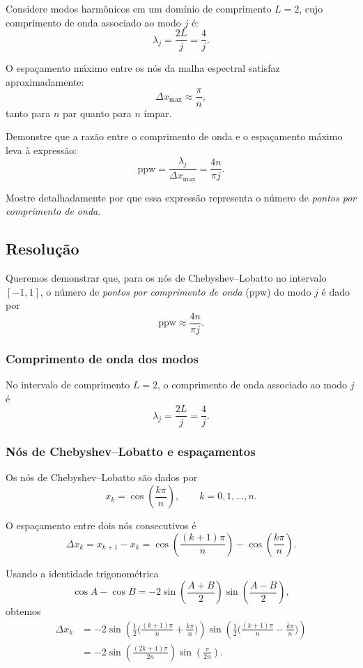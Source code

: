 \documentclass[12pt,a4paper]{article}
\begin{document}
Considere modos harmônicos em um domínio de comprimento $L = 2$, cujo comprimento de onda associado ao modo $j$ é:
\[
\lambda_j = \frac{2L}{j} = \frac{4}{j}.
\]

O espaçamento máximo entre os nós da malha espectral satisfaz aproximadamente:
\[
\Delta x_{\max} \approx \frac{\pi}{n},
\]
tanto para $n$ par quanto para $n$ ímpar.

Demonstre que a razão entre o comprimento de onda e o espaçamento máximo leva à expressão:
\[
\text{ppw} = \frac{\lambda_j}{\Delta x_{\max}} 
= \frac{4n}{\pi j}.
\]

Mostre detalhadamente por que essa expressão representa o número de \emph{pontos por comprimento de onda}.

\subsection{Resolução}

Queremos demonstrar que, para os nós de Chebyshev--Lobatto no intervalo $[-1,1]$,
o número de \emph{pontos por comprimento de onda} (ppw) do modo $j$ é dado por
\[
  \mathrm{ppw} \approx \frac{4n}{\pi j}.
\]

\subsubsection{Comprimento de onda dos modos}

No intervalo de comprimento $L = 2$, o comprimento de onda associado ao modo $j$
é
\[
  \lambda_j = \frac{2L}{j} = \frac{4}{j}.
\]

\subsubsection{Nós de Chebyshev--Lobatto e espaçamentos}

Os nós de Chebyshev--Lobatto são dados por
\[
  x_k = \cos\!\left(\frac{k\pi}{n}\right), \qquad k = 0,1,\dots,n.
\]

O espaçamento entre dois nós consecutivos é
\[
  \Delta x_k = x_{k+1} - x_k
  = \cos\!\left(\frac{(k+1)\pi}{n}\right) - \cos\!\left(\frac{k\pi}{n}\right).
\]

Usando a identidade trigonométrica
\[
  \cos A - \cos B = -2 \sin\!\left(\frac{A+B}{2}\right)\sin\!\left(\frac{A-B}{2}\right),
\]
obtemos
\begin{align*}
  \Delta x_k
  &= -2 \sin\!\left(\frac{1}{2}\Big(\tfrac{(k+1)\pi}{n} + \tfrac{k\pi}{n}\Big)\right)
        \sin\!\left(\frac{1}{2}\Big(\tfrac{(k+1)\pi}{n} - \tfrac{k\pi}{n}\Big)\right) \\[4pt]
  &= -2 \sin\!\left(\frac{(2k+1)\pi}{2n}\right)
        \sin\!\left(\frac{\pi}{2n}\right).
\end{align*}
\end{document}
